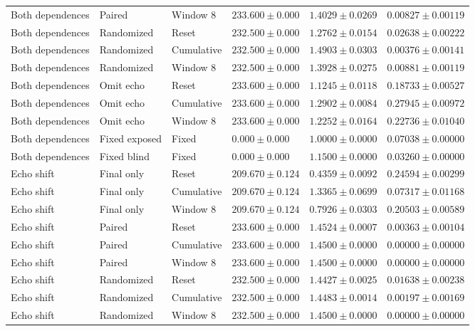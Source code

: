 \begin{longtable}{@{}llllll@{}}
Both dependences & Paired & Window 8 & $233.600 \pm 0.000$ & $1.4029 \pm 0.0269$ & $0.00827 \pm 0.00119$ \\
Both dependences & Randomized & Reset & $232.500 \pm 0.000$ & $1.2762 \pm 0.0154$ & $0.02638 \pm 0.00222$ \\
Both dependences & Randomized & Cumulative & $232.500 \pm 0.000$ & $1.4903 \pm 0.0303$ & $0.00376 \pm 0.00141$ \\
Both dependences & Randomized & Window 8 & $232.500 \pm 0.000$ & $1.3928 \pm 0.0275$ & $0.00881 \pm 0.00119$ \\
Both dependences & Omit echo & Reset & $233.600 \pm 0.000$ & $1.1245 \pm 0.0118$ & $0.18733 \pm 0.00527$ \\
Both dependences & Omit echo & Cumulative & $233.600 \pm 0.000$ & $1.2902 \pm 0.0084$ & $0.27945 \pm 0.00972$ \\
Both dependences & Omit echo & Window 8 & $233.600 \pm 0.000$ & $1.2252 \pm 0.0164$ & $0.22736 \pm 0.01040$ \\
Both dependences & Fixed exposed & Fixed & $0.000 \pm 0.000$ & $1.0000 \pm 0.0000$ & $0.07038 \pm 0.00000$ \\
Both dependences & Fixed blind & Fixed & $0.000 \pm 0.000$ & $1.1500 \pm 0.0000$ & $0.03260 \pm 0.00000$ \\
Echo shift & Final only & Reset & $209.670 \pm 0.124$ & $0.4359 \pm 0.0092$ & $0.24594 \pm 0.00299$ \\
Echo shift & Final only & Cumulative & $209.670 \pm 0.124$ & $1.3365 \pm 0.0699$ & $0.07317 \pm 0.01168$ \\
Echo shift & Final only & Window 8 & $209.670 \pm 0.124$ & $0.7926 \pm 0.0303$ & $0.20503 \pm 0.00589$ \\
Echo shift & Paired & Reset & $233.600 \pm 0.000$ & $1.4524 \pm 0.0007$ & $0.00363 \pm 0.00104$ \\
Echo shift & Paired & Cumulative & $233.600 \pm 0.000$ & $1.4500 \pm 0.0000$ & $0.00000 \pm 0.00000$ \\
Echo shift & Paired & Window 8 & $233.600 \pm 0.000$ & $1.4500 \pm 0.0000$ & $0.00000 \pm 0.00000$ \\
Echo shift & Randomized & Reset & $232.500 \pm 0.000$ & $1.4427 \pm 0.0025$ & $0.01638 \pm 0.00238$ \\
Echo shift & Randomized & Cumulative & $232.500 \pm 0.000$ & $1.4483 \pm 0.0014$ & $0.00197 \pm 0.00169$ \\
Echo shift & Randomized & Window 8 & $232.500 \pm 0.000$ & $1.4500 \pm 0.0000$ & $0.00000 \pm 0.00000$ \\

\end{longtable}
